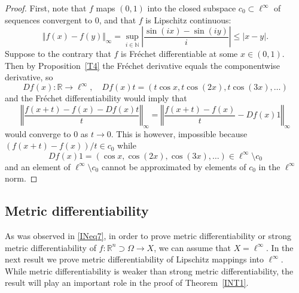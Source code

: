 \documentclass[12pt,leqno]{amsart}
\theoremstyle{definition}
\newcommand{\bbbn}{\mathbb N}
\newcommand{\bbbr}{\mathbb R}
\numberwithin{theorem}{section} \numberwithin{equation}{section}
\begin{document}
\begin{proof}
First, note that $f$ maps $(0,1)$ into the closed subspace $c_0\subset\ell^\infty$ of sequences convergent to $0$, and that $f$ is Lipschitz continuous:
$$
\Vert f(x)-f(y)\Vert_\infty=\sup_{i\in\bbbn} \left|\frac{\sin (ix)-\sin(iy)}{i}\right|\leq |x-y|.
$$
Suppose to the contrary that $f$ is Fr\'echet differentiable at some $x\in(0,1)$. Then by Proposition~\ref{T4} the Fr\'echet derivative equals the componentwise derivative, so
$$
Df(x):\bbbr\to\ell^\infty,
\quad
Df(x)t=(t\cos x, t\cos(2x),t\cos(3x),\ldots)
$$
and the Fr\'echet differentiability would imply that
$$
\left\Vert \frac{f(x+t)-f(x)-Df(x)t}{t}\right\Vert_\infty=
\left\Vert \frac{f(x+t)-f(x)}{t}-Df(x)1\right\Vert_\infty
$$
would converge to $0$ as $t\to 0$. This is however, impossible because $(f(x+t)-f(x))/t\in c_0$ while
$$
Df(x)1=(\cos x,\cos(2x),\cos(3x),\ldots)\in\ell^\infty\setminus c_0
$$
and an element of $\ell^\infty\setminus c_0$ cannot be approximated by elements of $c_0$ in the $\ell^\infty$ norm.
\end{proof}







\subsection{Metric differentiability}
\label{MD1}
As was observed in \eqref{INeq7}, in order to prove metric differentiability or strong metric differentiability of $f:\bbbr^n\supset\Omega\to X$, we can assume that $X=\ell^\infty$. In the next result we prove metric differentiability of Lipschitz mappings into $\ell^\infty$. While metric differentiability is weaker than strong metric differentiability, the result will play an important role in the proof of Theorem~\ref{INT1}.
\end{document}
